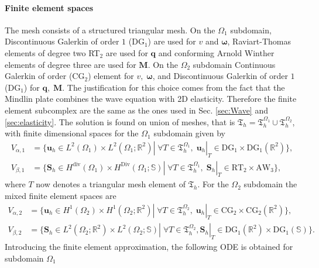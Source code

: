 \documentclass[11pt,a4paper]{article}
\newcommand{\bbR}{\mathbb{R}}
\newcommand{\bbS}{\mathbb{S}}
\renewcommand{\div}{\operatorname{div}}
\DeclareMathOperator*{\Div}{Div}
\begin{document}
\paragraph{Finite element spaces}
The mesh consists of a structured triangular mesh. On the $\Omega_1$ subdomain, Discontinuous Galerkin of order $1$ (DG$_1$)  are used for $v$ and $\bm{\omega}$, Raviart-Thomas elements of degree two RT$_2$ are used for $\bm{q}$ and conforming Arnold Winther elements \cite{arnold2002elasticity} of degree three are used for $\bm{M}$. On the $\Omega_2$ subdomain Continuous Galerkin of order (CG$_2$) element for $v, \; \bm{\omega}$, and Discontinuous Galerkin of order $1$ (DG$_1$) for $\bm{q}, \; \bm{M}$.  The justification for this choice comes from the fact that the Mindlin plate combines the wave equation with 2D elasticity. Therefore the finite element subcomplex are the same as the ones used in Sec. \ref{sec:Wave} and \ref{sec:elasticity}. The solution is found on union of meshes, that is $\mathfrak{T}_h=\mathfrak{T}_h^{\Omega_1}\cup\mathfrak{T}_h^{\Omega_2}$, with finite dimensional spaces for the $\Omega_1$ subdomain given by
\begin{equation}
    \begin{split}
         V_{\alpha, 1} &= \{\bm{u}_h\in L^2(\Omega_1) \times L^2(\Omega_1; \bbR^2)|\; \forall T\in\mathfrak{T}_h^{\Omega_1}, \; \bm{u}_h|_T\in \mathrm{DG}_1 \times \mathrm{DG}_1(\bbR^2)\}, \\
         V_{\beta, 1} &= \{\bm{S}_h\in H^{\div}(\Omega_1) \times H^{\Div}(\Omega_1; \bbS)|\; \forall T\in\mathfrak{T}_h^{\Omega_1}, \; \bm{S}_h|_T\in \mathrm{RT}_2 \times \mathrm{AW}_3\}, 
    \end{split}
\end{equation}
where $T$ now denotes a triangular mesh element of $\mathfrak{T}_h$. For the $\Omega_2$ subdomain the mixed finite element spaces are
\begin{equation}
    \begin{split}
        V_{\alpha, 2} &= \{\bm{u}_h\in H^1(\Omega_2) \times H^1(\Omega_2; \bbR^2)|\; \forall T\in\mathfrak{T}_h^{\Omega_2},\; \bm{u}_h|_T\in \mathrm{CG}_2 \times \mathrm{CG}_2(\bbR^2)\}, \\
        V_{\beta, 2} &= \{\bm{S}_h\in L^2(\Omega_2; \bbR^2) \times L^2(\Omega_2; \bbS)|\; \forall T\in\mathfrak{T}_h^{\Omega_2}, \bm{S}_h|_T\in \mathrm{DG}_1(\bbR^2) \times \mathrm{DG}_1(\bbS)\}.
    \end{split}
\end{equation}
Introducing the finite element approximation, the following ODE is obtained for subdomain $\Omega_1$
\end{document}
